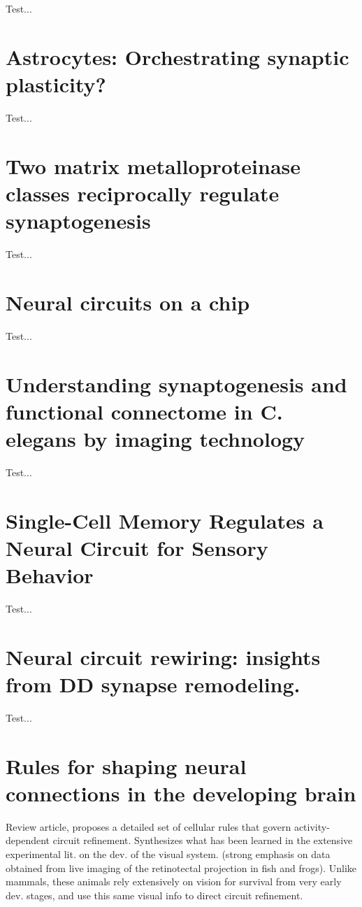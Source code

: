 \documentclass[11pt, a4paper, oneside]{article}   	%
\begin{document}
Test...

\section{Astrocytes: Orchestrating synaptic plasticity? \cite{DePitta2016}}

Test...

\section{Two matrix metalloproteinase classes reciprocally regulate synaptogenesis \cite{Dear2015}}

Test...

\section{Neural circuits on a chip \cite{Hasan2016}}

Test...

\section{Understanding synaptogenesis and functional connectome in C. elegans by imaging technology \cite{Hong2016}}

Test...

\section{Single-Cell Memory Regulates a Neural Circuit for Sensory Behavior \cite{Kobayashi2016}}

Test...

\section{Neural circuit rewiring: insights from DD synapse remodeling. \cite{Kurup2016}}

Test...

\section{Rules for shaping neural connections in the developing brain \cite{Kutsarova2016}}

Review article, proposes a detailed set of cellular rules that govern activity-dependent circuit refinement. Synthesizes what has been learned in the extensive experimental lit. on the dev. of the visual system. (strong emphasis on data obtained from live imaging of the retinotectal projection in fish and frogs). Unlike mammals, these animals rely extensively on vision for survival from very early dev. stages, and use this same visual info to direct circuit refinement.
\end{document}
